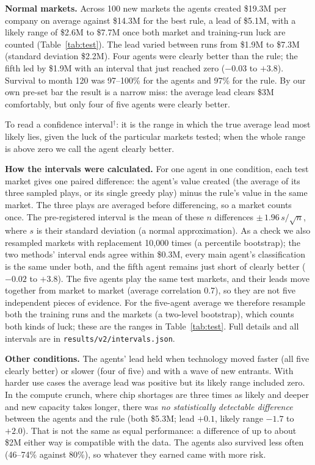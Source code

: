 \documentclass[11pt]{article}
\newcommand{\gl}[1]{#1\hyperref[app:glossary]{$^{\dagger}$}}
\begin{document}
\textbf{Normal markets.} Across 100 new markets the agents created \$19.3M per company on average against \$14.3M for the best rule, a lead of \$5.1M, with a likely range of \$2.6M to \$7.7M once both market and training-run luck are counted (Table~\ref{tab:test}). The lead varied between runs from \$1.9M to \$7.3M (standard deviation \$2.2M). Four agents were clearly better than the rule; the fifth led by \$1.9M with an interval that just reached zero ($-0.03$ to $+3.8$). Survival to month 120 was 97--100\% for the agents and 97\% for the rule. By our own pre-set bar the result is a narrow miss: the average lead clears \$3M comfortably, but only four of five agents were clearly better.

To read a \gl{confidence interval}: it is the range in which the true average lead most likely lies, given the luck of the particular markets tested; when the whole range is above zero we call the agent clearly better.

\textbf{How the intervals were calculated.} For one agent in one condition, each test market gives one paired difference: the agent's value created (the average of its three sampled plays, or its single greedy play) minus the rule's value in the same market. The three plays are averaged before differencing, so a market counts once. The pre-registered interval is the mean of these $n$ differences $\pm\,1.96\,s/\sqrt{n}$, where $s$ is their standard deviation (a normal approximation). As a check we also resampled markets with replacement 10{,}000 times (a percentile bootstrap); the two methods' interval ends agree within \$0.3M, every main agent's classification is the same under both, and the fifth agent remains just short of clearly better ($-0.02$ to $+3.8$). The five agents play the same test markets, and their leads move together from market to market (average correlation 0.7), so they are not five independent pieces of evidence. For the five-agent average we therefore resample both the training runs and the markets (a two-level bootstrap), which counts both kinds of luck; these are the ranges in Table~\ref{tab:test}. Full details and all intervals are in \texttt{results/v2/intervals.json}.

\textbf{Other conditions.} The agents' lead held when technology moved faster (all five clearly better) or slower (four of five) and with a wave of new entrants. With harder use cases the average lead was positive but its likely range included zero. In the compute crunch, where chip shortages are three times as likely and deeper and new capacity takes longer, there was \emph{no statistically detectable difference} between the agents and the rule (both \$5.3M; lead $+0.1$, likely range $-1.7$ to $+2.0$). That is not the same as equal performance: a difference of up to about \$2M either way is compatible with the data. The agents also survived less often (46--74\% against 80\%), so whatever they earned came with more risk.
\end{document}
